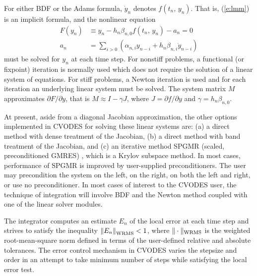 For either BDF or the Adams formula, $\dot{y}_n$ denotes
$f(t_n,\,y_n)$. That is, (\ref{e:lmm}) is an implicit formula, and 
the nonlinear equation 
\begin{equation}\label{e:nonlinear}
  \begin{split}
    F(y_n) &\equiv  y_n-h_n\beta_{n,0}f(t_n,\,y_n) - a_n=0   \\
    a_n &= \sum_{i>0}(\alpha_{n,i}y_{n-i}+h_n\beta_{n,i}\dot{y}_{n-i}) 
  \end{split}
\end{equation}
must be solved for $y_{n}$ at each time step. For nonstiff problems,
a functional (or fixpoint) iteration is normally used which does not
require the solution of a linear system of equations. For stiff
problems, a Newton iteration is used and for each iteration an
underlying linear system must be solved. The system matrix 
$M$ approximates $\partial F/ \partial y$, that is
$M \approx I-\gamma J$, where $J = {\partial f}/{\partial y}$
and $\gamma = h_n\beta_{n,0}$.

At present, aside from a diagonal Jacobian approximation, the other
options implemented in CVODES for solving these linear systems are:
(a) a direct method with dense treatment of the Jacobian,
(b) a direct method with band treatment of the Jacobian, and
(c) an iterative method SPGMR (scaled, preconditioned
GMRES) \cite{BrHi:89}, which is a Krylov subspace method. In most
cases, performance of SPGMR is improved by user-supplied
preconditioners. The user may precondition the system on the left, on
the right, on both the left and right, or use no preconditioner.
In most cases of interest to the CVODES user, the technique of
integration will involve BDF and the Newton method coupled with one of the 
linear solver modules.

The integrator computes an estimate $E_{n}$ of the local error at each time
step and strives to satisfy the inequality
$\left\| E_n\right\|_{\mbox{\scriptsize WRMS}} < 1$,
where $\|\cdot\|_{\mbox{\scriptsize WRMS}}$ is the weighted root-mean-square norm
defined in terms of the user-defined relative and absolute tolerances. 
The error control mechanism in CVODES varies the stepsize and order
in an attempt to take minimum number of steps while satisfying the local
error test. 

